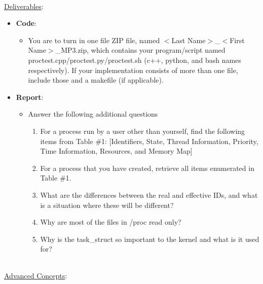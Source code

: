 \documentclass[12pt]{extarticle}
\begin{document}
\ \\
{\large \underline{Deliverables}:}
\begin{itemize}
    
    \item \textbf{Code}: 
    \begin{itemize}
    
        \item You are to turn in one file ZIP file, named $<$Last Name$>$\_$<$First Name$>$\_MP3.zip, which contains your program/script named proctest.cpp/proctest.py/proctest.sh (c++, python, and bash names respectively).  If your implementation consists of more than one file, include those and a makefile (if applicable).  
    
    \end{itemize}
    \item \textbf{Report}:
    \begin{itemize}
    
        \item Answer the following additional questions
        \begin{enumerate}
        
            \item For a process run by a user other than yourself, find the following items from Table \#1: [Identifiers, State, Thread Information, Priority, Time Information, Resources, and Memory Map]
            \item For a process that you have created, retrieve all items enumerated in Table \#1.  
            \item What are the differences between the real and effective IDs, and what is a situation where these will be different?
            \item Why are most of the files in /proc read only?
            \item Why is the task\_struct so important to the kernel and what is it used for?
        
        \end{enumerate}
    
    \end{itemize}
    
\end{itemize}


\ \\
{\large \underline{Advanced Concepts}:}
\end{document}
